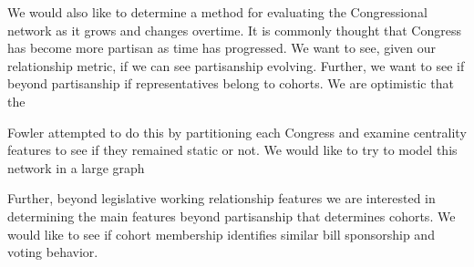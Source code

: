 We would also like to determine a method for evaluating the Congressional
network as it grows and changes overtime. It is commonly thought that Congress
has become more partisan as time has progressed. We want to see, given our
relationship metric, if we can see partisanship evolving. Further, we want to
see if beyond partisanship if representatives belong to cohorts. We are 
optimistic that the

Fowler attempted to do this by  partitioning each Congress and examine
centrality features to see if they  remained static or not. We would like to try
to model this network in a  large graph


Further, beyond legislative working relationship features we are interested in 
determining the main features beyond partisanship that determines cohorts. We 
would like to see if cohort membership identifies similar bill sponsorship and 
voting behavior.
